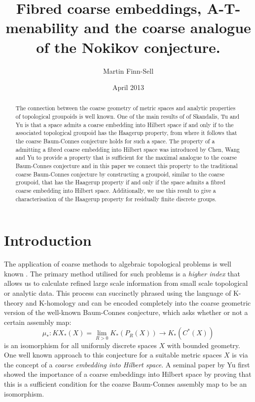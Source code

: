 \documentclass[11pt]{amsart}
\title{Fibred coarse embeddings, A-T-menability and the coarse analogue of the Nokikov conjecture.}
\date{April 2013}
\author{Martin Finn-Sell}
\theoremstyle{plain}
\theoremstyle{definition}%
\theoremstyle{remark}%
\begin{document}

\maketitle
\begin{abstract}
The connection between the coarse geometry of metric spaces and analytic properties of topological groupoids is well known. One of the main results of of Skandalis, Tu and Yu is that a space admits a coarse embedding into Hilbert space if and only if to the associated topological groupoid has the Haagerup property, from where it follows that the coarse Baum-Connes conjecture holds for such a space. The property of a admitting a fibred coarse embedding into Hilbert space was introduced by Chen, Wang and Yu to provide a property that is sufficient for the maximal analogue to the coarse Baum-Connes conjecture and in this paper we connect this property to the traditional coarse Baum-Connes conjecture by constructing a groupoid, similar to the coarse groupoid, that has the Haagerup property if and only if the space admits a fibred coarse embedding into Hilbert space. Additionally, we use this result to give a characterisation of the Haagerup property for residually finite discrete groups.
\end{abstract}

\section{Introduction}

The application of coarse methods to algebraic topological problems is well known \cite{MR866507,MR1728880}. The primary method utilised for such problems is a \textit{higher index} that allows us to calculate refined large scale information from small scale topological or analytic data. This process can succinctly phrased using the language of K-theory and K-homology and can be encoded completely into the coarse geometric version of the well-known Baum-Connes conjecture, which asks whether or not a certain assembly map:
\begin{equation*}
\mu_{*}:KX_{*}(X)=\lim_{R>0}K_{*}(P_{R}(X)) \longrightarrow K_{*}(C^{*}(X))
\end{equation*}
is an isomorphism for all uniformly discrete spaces $X$ with bounded geometry. One well known approach to this conjecture for a suitable metric spaces $X$ is via the concept of a \textit{coarse embedding into Hilbert space}. A seminal paper by Yu \cite{MR1728880} first showed the importance of a coarse embeddings into Hilbert space by proving that this is a sufficient condition for the coarse Baum-Connes assembly map to be an isomorphism.
\end{document}
